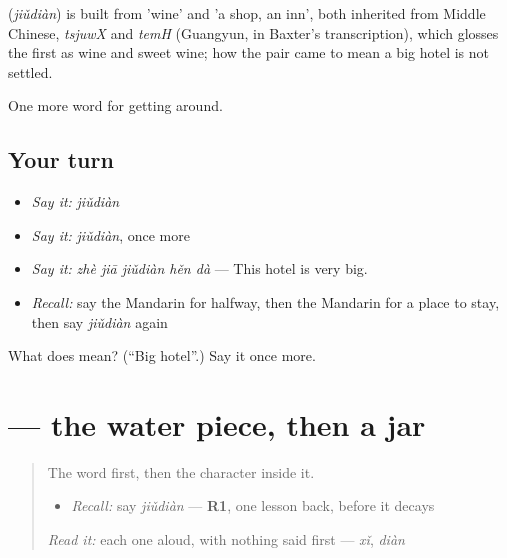 \begin{cousinweb}
\textbf{} (\emph{jiǔdiàn}) is built from  'wine' and  'a shop, an inn', both inherited from Middle Chinese, \emph{tsjuwX} and \emph{temH} (Guangyun, in Baxter's transcription), which glosses the first as wine and sweet wine; how the pair came to mean a big hotel is not settled.
\end{cousinweb}

\begin{grammarlens}[title={What you've built}]
One more word for getting around.
\end{grammarlens}

\subsection*{Your turn}
\begin{itemize}
\raggedright
  \item \emph{Say it:} \emph{jiǔdiàn}
  \item \emph{Say it:} \emph{jiǔdiàn}, once more
  \item \emph{Say it:} \emph{zhè jiā jiǔdiàn hěn dà} — This hotel is very big.
  \item \emph{Recall:} say the Mandarin for halfway, then the Mandarin for a place to stay, then say \emph{jiǔdiàn} again
\end{itemize}

\begin{tcolorbox}[breakable,colback=teal!4,colframe=teal!35!black,title={Before you move on}]
What does  mean? (\textquotedblleft{}Big hotel\textquotedblright{}.) Say it once more.
\end{tcolorbox}
\section[\texorpdfstring{\zh{酒} (jiǔ)}{酒 (jiǔ)}]{ — the water piece, then a jar}

\label{lesson:ZH-W425-jiu-wine}



\begin{quote}
The word first, then the character inside it.

\begin{itemize}
\raggedright
  \item \emph{Recall:} say \emph{jiǔdiàn} — \textbf{R1}, one lesson back, before it decays
\end{itemize}

\begin{quote}
 
\end{quote}

\emph{Read it:} each one aloud, with nothing said first — \emph{xǐ}, \emph{diàn}
\end{quote}

